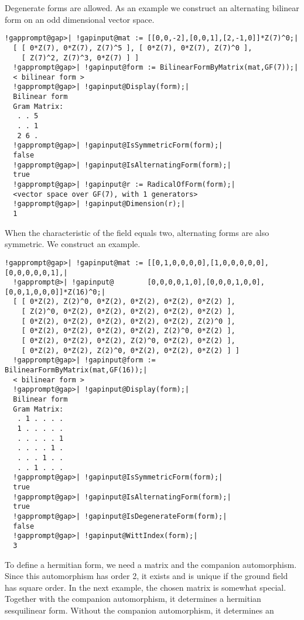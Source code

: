 \documentclass[a4paper,11pt]{report}
\begin{document}
{{{ Degenerate forms are allowed. As an example we construct an alternating
bilinear form on an odd dimensional vector space. 
\begin{Verbatim}[commandchars=!@|,fontsize=\small,frame=single,label=Example]
  !gapprompt@gap>| !gapinput@mat := [[0,0,-2],[0,0,1],[2,-1,0]]*Z(7)^0;|
  [ [ 0*Z(7), 0*Z(7), Z(7)^5 ], [ 0*Z(7), 0*Z(7), Z(7)^0 ], 
    [ Z(7)^2, Z(7)^3, 0*Z(7) ] ]
  !gapprompt@gap>| !gapinput@form := BilinearFormByMatrix(mat,GF(7));|
  < bilinear form >
  !gapprompt@gap>| !gapinput@Display(form);|
  Bilinear form
  Gram Matrix:
   . . 5
   . . 1
   2 6 .
  !gapprompt@gap>| !gapinput@IsSymmetricForm(form);|
  false
  !gapprompt@gap>| !gapinput@IsAlternatingForm(form);|
  true
  !gapprompt@gap>| !gapinput@r := RadicalOfForm(form);|
  <vector space over GF(7), with 1 generators>
  !gapprompt@gap>| !gapinput@Dimension(r);|
  1 
\end{Verbatim}
 When the characteristic of the field equals two, alternating forms are also
symmetric. We construct an example. 
\begin{Verbatim}[commandchars=!@|,fontsize=\small,frame=single,label=Example]
  !gapprompt@gap>| !gapinput@mat := [[0,1,0,0,0,0],[1,0,0,0,0,0],[0,0,0,0,0,1],|
  !gapprompt@>| !gapinput@        [0,0,0,0,1,0],[0,0,0,1,0,0],[0,0,1,0,0,0]]*Z(16)^0;|
  [ [ 0*Z(2), Z(2)^0, 0*Z(2), 0*Z(2), 0*Z(2), 0*Z(2) ], 
    [ Z(2)^0, 0*Z(2), 0*Z(2), 0*Z(2), 0*Z(2), 0*Z(2) ], 
    [ 0*Z(2), 0*Z(2), 0*Z(2), 0*Z(2), 0*Z(2), Z(2)^0 ], 
    [ 0*Z(2), 0*Z(2), 0*Z(2), 0*Z(2), Z(2)^0, 0*Z(2) ], 
    [ 0*Z(2), 0*Z(2), 0*Z(2), Z(2)^0, 0*Z(2), 0*Z(2) ], 
    [ 0*Z(2), 0*Z(2), Z(2)^0, 0*Z(2), 0*Z(2), 0*Z(2) ] ]
  !gapprompt@gap>| !gapinput@form := BilinearFormByMatrix(mat,GF(16));|
  < bilinear form >
  !gapprompt@gap>| !gapinput@Display(form);|
  Bilinear form
  Gram Matrix:
   . 1 . . . .
   1 . . . . .
   . . . . . 1
   . . . . 1 .
   . . . 1 . .
   . . 1 . . .
  !gapprompt@gap>| !gapinput@IsSymmetricForm(form);|
  true
  !gapprompt@gap>| !gapinput@IsAlternatingForm(form);|
  true
  !gapprompt@gap>| !gapinput@IsDegenerateForm(form);|
  false
  !gapprompt@gap>| !gapinput@WittIndex(form);|
  3 
\end{Verbatim}
 To define a hermitian form, we need a matrix and the companion automorphism.
Since this automorphism has order 2, it exists and is unique if the ground
field has square order. In the next example, the chosen matrix is somewhat
special. Together with the companion automorphism, it determines a hermitian
sesquilinear form. Without the companion automorphism, it determines an
}}}
\end{document}
